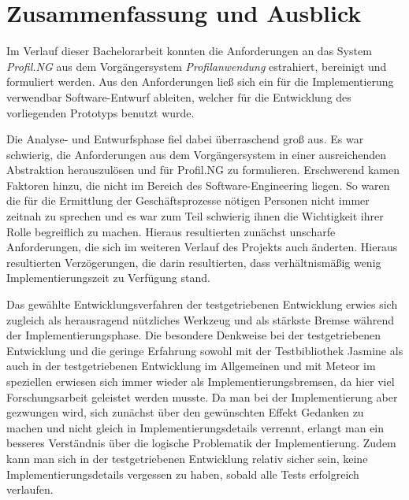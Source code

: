 
\chapter{Zusammenfassung und Ausblick} %

\label{ch:zusammenfassungUndAusblick} %



Im Verlauf dieser Bachelorarbeit konnten die Anforderungen an das System
\textit{Profil.NG} aus dem Vorgängersystem \textit{Profilanwendung} estrahiert,
bereinigt und formuliert werden. Aus den Anforderungen  ließ sich ein für die
Implementierung verwendbar Software-Entwurf ableiten, welcher für die
Entwicklung des vorliegenden Prototyps benutzt wurde.

Die Analyse- und Entwurfsphase fiel dabei überraschend groß aus. Es war
schwierig, die Anforderungen aus dem Vorgängersystem in einer ausreichenden
Abstraktion herauszulösen und für Profil.NG zu formulieren. Erschwerend kamen
Faktoren hinzu, die nicht im Bereich des Software-Engineering liegen. So waren
die für die Ermittlung der Geschäftsprozesse nötigen Personen nicht immer
zeitnah zu sprechen und es war zum Teil schwierig ihnen die Wichtigkeit ihrer
Rolle begreiflich zu machen. Hieraus resultierten zunächst unscharfe
Anforderungen, die sich im weiteren Verlauf des Projekts auch änderten. Hieraus
resultierten Verzögerungen, die darin resultierten, dass verhältnismäßig wenig
Implementierungszeit zu Verfügung stand.

Das gewählte Entwicklungsverfahren der testgetriebenen Entwicklung erwies sich
zugleich als herausragend nützliches Werkzeug und als stärkste Bremse während
der Implementierungsphase. Die besondere Denkweise bei der testgetriebenen
Entwicklung und die geringe Erfahrung sowohl mit der Testbibliothek Jasmine als
auch in der testgetriebenen Entwicklung im Allgemeinen und mit Meteor im
speziellen erwiesen sich immer wieder als Implementierungsbremsen, da hier viel
Forschungsarbeit geleistet werden musste. Da man bei der Implementierung aber
gezwungen wird, sich zunächst über den gewünschten Effekt Gedanken zu machen und
nicht gleich in Implementierungsdetails verrennt, erlangt man ein besseres
Verständnis über die logische Problematik der Implementierung. Zudem kann man
sich in der testgetriebenen Entwicklung relativ sicher sein, keine
Implementierungsdetails vergessen zu haben, sobald alle Tests erfolgreich
verlaufen.


